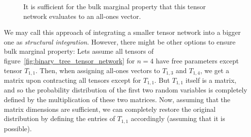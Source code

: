 \documentclass[../../main.tex]{subfiles}
\begin{document}
    \begin{figure}[h]
        \centering
        \caption{It is sufficient for the bulk marginal property that this tensor network evaluates to an all-ones vector.}
        \label{fig:sufficient_condition_bmp}
    \end{figure}

    We may call this approach of integrating a smaller tensor network into a bigger one as \emph{structural integration}. However, there might be other options to ensure bulk marginal property: Lets assume all tensors of figure~\ref{fig:binary_tree_tensor_network} for $n = 4$ have free parameters except tensor $T_{1,1}$. Then, when assigning all-ones vectors to $T_{1,3}$ and $T_{1,4}$, we get a matrix upon contracting all tensors except for $T_{1,1}$. But $T_{1,1}$ itself is a matrix, and so the probability distribution of the first two random variables is completely defined by the multiplication of these two matrices. Now, assuming that the matrix dimensions are sufficient, we can completely restore the original distribution by defining the entries of $T_{1,1}$ accordingly (assuming that it is possible).
\end{document}
